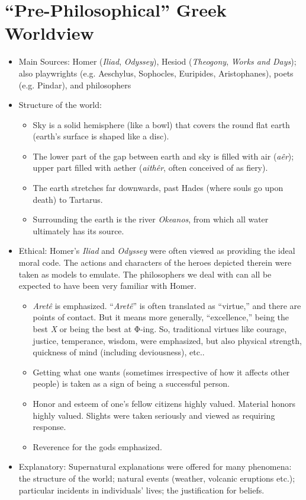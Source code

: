 \documentclass[11pt]{article}
\newcommand{\gk}[1]{\textgreek{#1}}
\begin{document}
\section*{``Pre-Philosophical'' Greek Worldview}
\begin{itemize}\item{Main Sources: Homer (\emph{Iliad}, \emph{Odyssey}), Hesiod (\emph{Theogony}, \emph{Works and Days}); also playwrights (e.g. Aeschylus, Sophocles, Euripides, Aristophanes), poets (e.g. Pindar), and philosophers}

\item{Structure of the world:} \begin{itemize}\item{Sky is a solid hemisphere (like a bowl) that covers the round flat earth (earth's surface is shaped like a disc).}\item{The lower part of the gap between earth and sky is filled with air (\emph{a\^{e}r}); upper part filled with aether (\emph{aith\^{e}r}, often conceived of as fiery).}\item{The earth stretches far downwards, past Hades (where souls go upon death) to Tartarus.}\item{Surrounding the earth is the river \emph{Okeanos}, from which all water ultimately has its source.}\end{itemize}

\item{Ethical: Homer's \emph{Iliad} and \emph{Odyssey} were often viewed as providing the ideal moral code. The actions and characters of the heroes depicted therein were taken as models to emulate. The philosophers we deal with can all be expected to have been very familiar with Homer.}\begin{itemize}\item{\emph{Aret\^{e}} is emphasized. ``\emph{Aret\^{e}}'' is often translated as ``virtue,'' and there are points of contact. But it means more generally, ``excellence,'' being the best \emph{X} or being the best at \gk{Φ}-ing. So, traditional virtues like courage, justice, temperance, wisdom, were emphasized, but also physical strength, quickness of mind (including deviousness), etc..}\item{Getting what one wants (sometimes irrespective of how it affects other people) is taken as a sign of being a successful person.}\item{Honor and esteem of one's fellow citizens highly valued. Material honors highly valued. Slights were taken seriously and viewed as requiring response.}\item{Reverence for the gods emphasized.}\end{itemize}

\item{Explanatory: Supernatural explanations were offered for many phenomena: the structure of the world; natural events (weather, volcanic eruptions etc.); particular incidents in individuals' lives; the justification for beliefs.}\end{itemize}
\end{document}
